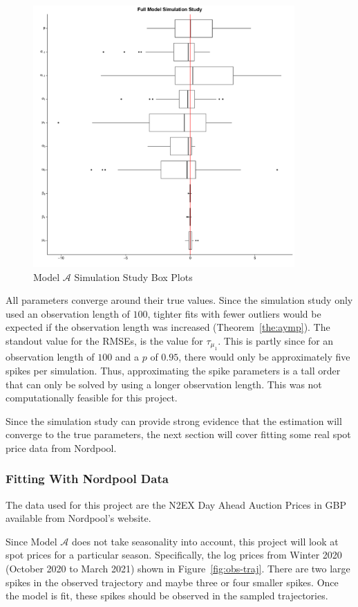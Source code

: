 \begin{figure}[H]
        \centering
        \includegraphics[width=10cm]{images/fitting/full_model/ss.pdf}
        \caption{Model $\mathcal{A}$ Simulation Study Box Plots}
        \label{fig:ss-full}
\end{figure}

All parameters converge around their true values. Since the simulation study only used an observation length of $100$, tighter fits with fewer outliers would be expected if the observation length was increased (Theorem~\ref{the:aymp}). The standout value for the RMSEs, is the value for $\tau_{\mu_1}$. This is partly since for an observation length of $100$ and a $p$ of $0.95$, there would only be approximately five spikes per simulation. Thus, approximating the spike parameters is a tall order that can only be solved by using a longer observation length. This was not computationally feasible for this project.

Since the simulation study can provide strong evidence that the estimation will converge to the true parameters, the next section will cover fitting some real spot price data from Nordpool.

\subsubsection{Fitting With Nordpool Data}
\label{subsec:fit-real}

The data used for this project are the N2EX Day Ahead Auction Prices in GBP available from Nordpool's website.

Since Model $\mathcal{A}$ does not take seasonality into account, this project will look at spot prices for a particular season. Specifically, the log prices from Winter 2020 (October 2020 to March 2021) shown in Figure~\ref{fig:obs-traj}. There are two large spikes in the observed trajectory and maybe three or four smaller spikes. Once the model is fit, these spikes should be observed in the sampled trajectories.

